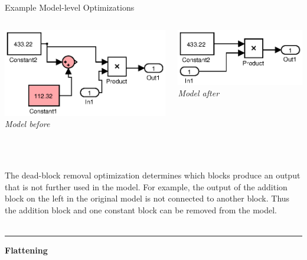 \documentclass[final,hyperref={pdfpagelabels=false}]{beamer}
\begin{document}
\begin{frame}{}
\begin{columns}[t,totalwidth=\linewidth]
\begin{column}{.585\linewidth}
\begin{block}{Example Model-level Optimizations}
\begin{columns}[c,totalwidth=\linewidth]
\begin{column}{.485\linewidth}
\begin{center}
         \includegraphics[width=0.8\linewidth]{images/models/HSimpleConstDead}\\
          \footnotesize \textit{Model before}
         \end{center}
         \end{column}
         \begin{column}{.485\linewidth}
         \begin{center}
         \includegraphics[width=0.8\linewidth]{images/models/HSimpleConstDead_export}\\
        \footnotesize \textit{Model after}
         \end{center}
         \end{column}
         \end{columns}
          \footnotesize ~\\~\\
         The dead-block removal optimization determines which blocks produce an output that is not further used in the model. For example, the output of the addition block on the left in the original model is not connected to another block. Thus the addition block and one constant block can be removed from the model.
          ~\\~\\
         \hrule
         \small
          \begin{center}\textbf{Flattening}\end{center}
                 \vspace{-0.3cm}
         \begin{columns}[c,totalwidth=\linewidth]
         \begin{column}{.485\linewidth}
         \begin{center}
         

\end{center}
\end{column}
\end{columns}
\end{block}
\end{column}
\end{columns}
\end{frame}
\end{document}
